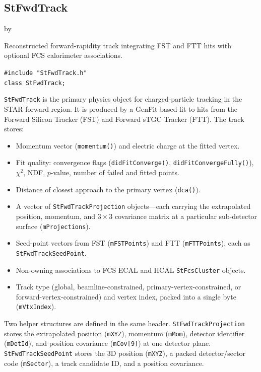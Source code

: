\documentclass[twoside]{article}
\newcommand{\entrylabel}[1]{\mbox{\textbf{{#1}}}\hfil}%
\newenvironment{entry}
{\begin{list}{}%
    {\renewcommand{\makelabel}{\entrylabel}%
     \setlength{\labelwidth}{90pt}%
     \setlength{\leftmargin}{\labelwidth}
     \advance\leftmargin by \labelsep%
      }%
    }%
  {\end{list}}
\newcommand{\Entrylabel}[1]%
{\raisebox{0pt}[1ex][0pt]{\makebox[\labelwidth][l]%
    {\parbox[t]{\labelwidth}{\hspace{0pt}\textbf{{#1}}}}}}
\newenvironment{Entry}%
{\renewcommand{\entrylabel}{\Entrylabel}\begin{entry}}%
  {\end{entry}}
\begin{document}
\subsection{StFwdTrack}
\label{sec:StFwdTrack}
\begin{Entry}
\item[Summary] Reconstructed forward-rapidity track integrating FST and FTT hits with
  optional FCS calorimeter associations.
\item[Synopsis]
    \verb+#include "StFwdTrack.h"+\\
    \verb+class StFwdTrack;+\\
\item[Description]
  \texttt{StFwdTrack} is the primary physics object for charged-particle tracking in the
  STAR forward region.  It is produced by a GenFit-based fit to hits from the Forward
  Silicon Tracker (FST) and Forward sTGC Tracker (FTT).  The track stores:
  \begin{itemize}
    \item Momentum vector (\texttt{momentum()}) and electric charge at the fitted vertex.
    \item Fit quality: convergence flags (\texttt{didFitConverge()},
      \texttt{didFitConvergeFully()}), $\chi^2$, NDF, $p$-value, number of failed and
      fitted points.
    \item Distance of closest approach to the primary vertex (\texttt{dca()}).
    \item A vector of \texttt{StFwdTrackProjection} objects---each carrying the
      extrapolated position, momentum, and $3\times3$ covariance matrix at a particular
      sub-detector surface (\texttt{mProjections}).
    \item Seed-point vectors from FST (\texttt{mFSTPoints}) and FTT
      (\texttt{mFTTPoints}), each as \texttt{StFwdTrackSeedPoint}.
    \item Non-owning associations to FCS ECAL and HCAL \texttt{StFcsCluster} objects.
    \item Track type (global, beamline-constrained, primary-vertex-constrained, or
      forward-vertex-constrained) and vertex index, packed into a single byte
      (\texttt{mVtxIndex}).
  \end{itemize}

  Two helper structures are defined in the same header.
  \texttt{StFwdTrackProjection} stores the extrapolated position (\texttt{mXYZ}),
  momentum (\texttt{mMom}), detector identifier (\texttt{mDetId}), and position
  covariance (\texttt{mCov[9]}) at one detector plane.
  \texttt{StFwdTrackSeedPoint} stores the 3D position (\texttt{mXYZ}), a packed
  detector/sector code (\texttt{mSector}), a track candidate ID, and a position
  covariance.


\end{Entry}
\end{document}
